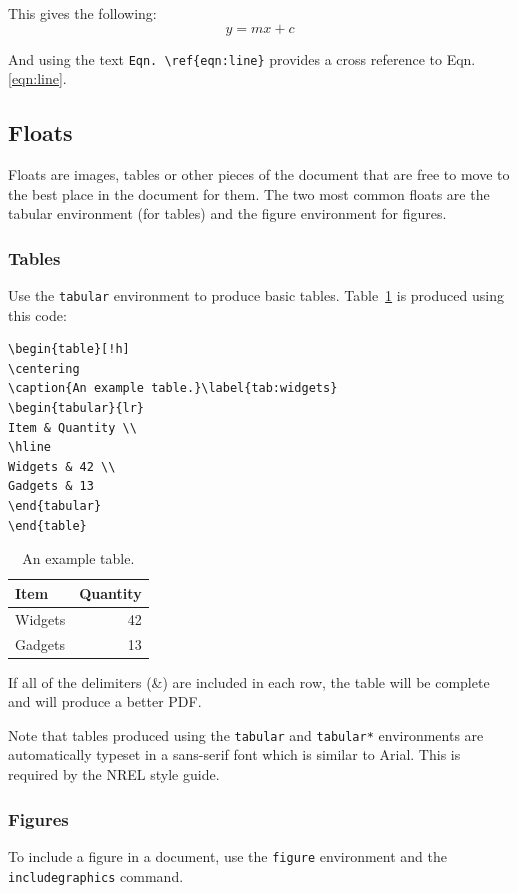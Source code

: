 This gives the following:
\begin{equation}
y = mx+c
\label{eqn:line}
\end{equation}

And using the text \verb+Eqn. \ref{eqn:line}+ provides a cross reference to Eqn. \ref{eqn:line}.

\subsection{Floats}
Floats are images, tables or other pieces of the document that are free to move to the best place in the document for them. The two most common floats are the tabular environment (for tables) and the figure environment for figures.

\subsubsection{Tables}
Use the \texttt{tabular} environment to produce basic tables. Table~\ref{tab:widgets} is produced using this code: 

\begin{lstlisting}
\begin{table}[!h]
\centering
\caption{An example table.}\label{tab:widgets}
\begin{tabular}{lr}
Item & Quantity \\
\hline
Widgets & 42 \\
Gadgets & 13
\end{tabular}
\end{table}
\end{lstlisting}

\begin{table}[!h]
\centering
\caption{An example table.}\label{tab:widgets}
\begin{tabular}{lr}
Item & Quantity \\
\hline
Widgets & 42 \\
Gadgets & 13
\end{tabular}
\end{table}

If all of the delimiters (\&) are included in each row, the table will be complete and will produce a better PDF.

Note that tables produced using the \texttt{tabular} and \texttt{tabular*} environments are automatically typeset in a sans-serif font which is similar to Arial. This is required by the NREL style guide.

\subsubsection{Figures}
To include a figure in a document, use the \texttt{figure} environment and the \texttt{includegraphics} command.

